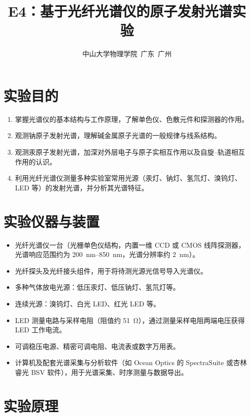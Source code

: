 \documentclass[a4paper,8pt,twocolumn]{article}
\title{
  \textbf{\huge E4：基于光纤光谱仪的原子发射光谱实验}
}
\author{
\small 中山大学物理学院~广东~广州
}
\begin{document}
\maketitle
\newpage

\section{实验目的}

\begin{enumerate}
  \item 掌握光谱仪的基本结构与工作原理，了解单色仪、色散元件和探测器的作用。
  \item 观测钠原子发射光谱，理解碱金属原子光谱的一般规律与线系结构。
  \item 观测汞原子发射光谱，加深对外层电子与原子实相互作用以及自旋–轨道相互作用的认识。
  \item 利用光纤光谱仪测量多种实验室常用光源（汞灯、钠灯、氢氘灯、溴钨灯、LED 等）的发射光谱，并分析其光谱特征。
\end{enumerate}

\section{实验仪器与装置}

\begin{itemize}
  \item 光纤光谱仪一台（光栅单色仪结构，内置一维 CCD 或 CMOS 线阵探测器，光谱响应范围约为 \SIrange{200}{850}{\nano\meter}，光谱分辨率约 \SI{2}{\nano\meter}）。
  \item 光纤探头及光纤接头组件，用于将待测光源光信号导入光谱仪。
  \item 多种气体放电光源：低压汞灯、低压钠灯、氢氘灯等。
  \item 连续光源：溴钨灯、白光 LED、红光 LED 等。
  \item LED 测量电路与采样电阻（阻值约 \SI{51}{\ohm}），通过测量采样电阻两端电压获得 LED 工作电流。
  \item 可调稳压电源、精密可调电阻、电流表或数字万用表。
  \item 计算机及配套光谱采集与分析软件（如 Ocean Optics 的 SpectraSuite 或杏林睿光 BSV 软件），用于光谱采集、时序测量与数据导出。
\end{itemize}

\section{实验原理}
\end{document}
